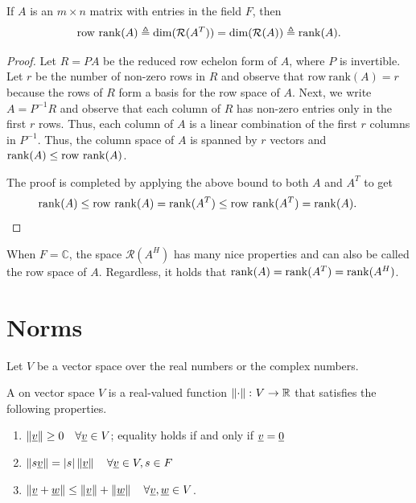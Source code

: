 \begin{theorem}
If $A$ is an $m \times n$ matrix with entries in the field $F$, then
\begin{equation*}
\mathrm{row~rank} (A) \triangleq \dim( \mathcal{R}(A^T)) =  \dim( \mathcal{R}(A)) \triangleq \mathrm{rank} (A).
\end{equation*}
\end{theorem}
\begin{proof}
Let $R=PA$ be the reduced row echelon form of $A$, where $P$ is invertible.
Let $r$ be the number of non-zero rows in $R$ and observe that $\mathrm{row~rank} (A) = r$ because the rows of $R$ form a basis for the row space of $A$.
Next, we write $A=P^{-1}R$ and observe that each column of $R$ has non-zero entries only in the first $r$ rows.
Thus, each column of $A$ is a linear combination of the first $r$ columns in $P^{-1}$.
Thus, the column space of $A$ is spanned by $r$ vectors and $\mathrm{rank} (A) \leq \mathrm{row~rank} (A)$.

The proof is completed by applying the above bound to both $A$ and $A^T$ to get
\[ \mathrm{rank} (A) \leq \mathrm{row~rank} (A) = \mathrm{rank} (A^T) \leq \mathrm{row~rank} (A^T) = \mathrm{rank} (A).   \tag*{\qedhere} \]
\end{proof}
When $F=\mathbb{C}$, the space $\mathcal{R}(A^H)$ has many nice properties and can also be called the row space of $A$.
Regardless, it holds that $\mathrm{rank}(A) = \mathrm{rank}(A^T) = \mathrm{rank}(A^H)$.



\section{Norms}

Let $V$ be a vector space over the real numbers or the complex numbers.

\begin{definition}
A  on vector space $V$ is a real-valued function $\left\| \cdot \right\| \colon V \rightarrow \mathbb{R}$ that satisfies the following properties.
\begin{enumerate}
\item $\left\| \underline{v} \right\| \geq 0 \quad \forall \underline{v} \in V$;
equality holds if and only if $\underline{v} = \underline{0}$
\item $\left\| s \underline{v} \right\| = |s| \left\| \underline{v} \right\| \quad \forall \underline{v} \in V, s \in F$
\item $\left\| \underline{v} + \underline{w} \right\| \leq
\left\| \underline{v} \right\| + \left\| \underline{w} \right\| \quad \forall \underline{v}, \underline{w} \in V$.
\end{enumerate}
\end{definition}


